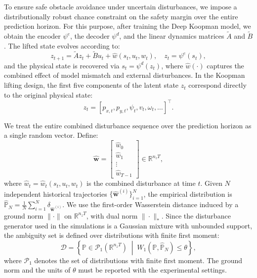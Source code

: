 \documentclass[pdflatex,sn-mathphys,Numbered]{sn-jnl}
\numberwithin{equation}{section}
\begin{document}
To ensure safe obstacle avoidance under uncertain disturbances, we impose a distributionally robust chance constraint on the safety margin over the entire prediction horizon. For this purpose, after training the Deep Koopman model, we obtain the encoder $\psi^e$, the decoder $\psi^d$, and the linear dynamics matrices $\widetilde{A}$ and $\widetilde{B}$. The lifted state evolves according to:
\begin{equation}
z_{t+1} = \widetilde{A} z_t + \widetilde{B} u_t + \hat{w}(s_t, u_t, w_t), \quad z_t = \psi^e(s_t), \label{equ:lifted_dynamics}
\end{equation}
and the physical state is recovered via $s_t = \psi^d(z_t)$, where $\hat{w}(\cdot)$ captures the combined effect of model mismatch and external disturbances. In the Koopman lifting design, the first five components of the latent state $z_t$ correspond directly to the original physical state:
\begin{equation}
z_t = [p_{x,t}, p_{y,t}, \psi_t, v_t, \omega_t, \ldots]^\top. \label{equ:latent_state}
\end{equation}

We treat the entire combined disturbance sequence over the prediction horizon as a single random vector. Define:
\begin{equation}
\hat{\mathbf{w}} = \begin{bmatrix} \hat{w}_0 \\ \hat{w}_1 \\ \vdots \\ \hat{w}_{T-1} \end{bmatrix} \in \mathbb{R}^{n_z T}, \label{equ:def_hatw}
\end{equation}
where $\hat{w}_t = \hat{w}_t(s_t,u_t,w_t)$ is the combined disturbance at time $t$. Given $N$ independent historical trajectories $\{\hat{\mathbf{w}}^{(i)}\}_{i=1}^N$, the empirical distribution is $\hat{\mathbb{P}}_N = \frac{1}{N}\sum_{i=1}^N \delta_{\hat{\mathbf{w}}^{(i)}}$. We use the first-order Wasserstein distance induced by a ground norm $\|\cdot\|$ on $\mathbb{R}^{n_z T}$, with dual norm $\|\cdot\|_*$. Since the disturbance generator used in the simulations is a Gaussian mixture with unbounded support, the ambiguity set is defined over distributions with finite first moment:
\begin{equation}
\mathcal{D} = \left\{ \mathbb{P} \in \mathcal{P}_1(\mathbb{R}^{n_z T}) \;\middle|\; W_1(\mathbb{P}, \hat{\mathbb{P}}_N) \le \theta \right\}, \label{equ:wass_ambiguity}
\end{equation}
where $\mathcal{P}_1$ denotes the set of distributions with finite first moment. The ground norm and the units of $\theta$ must be reported with the experimental settings.
\end{document}
